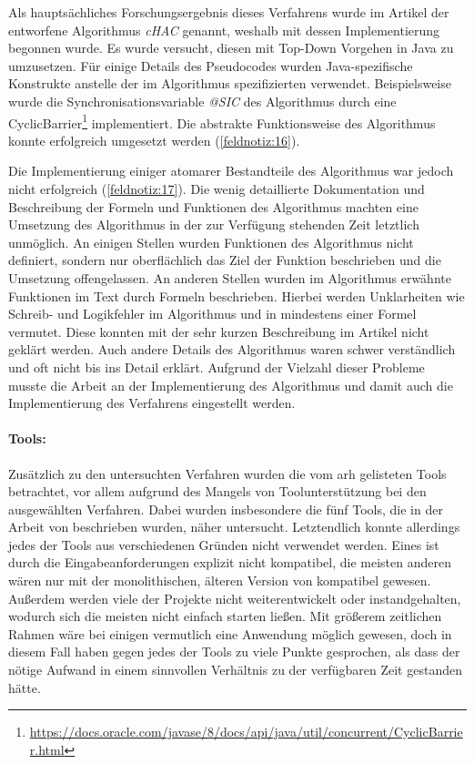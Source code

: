 Als hauptsächliches Forschungsergebnis dieses Verfahrens wurde im Artikel der entworfene Al\-go\-rith\-mus \emph{cHAC} genannt, weshalb mit dessen Implementierung begonnen wurde.
Es wurde versucht, diesen mit Top-Down Vorgehen in Java zu umzusetzen.
Für einige Details des Pseu\-do\-codes wurden Java-spezifische Konstrukte anstelle der im Algorithmus spezifizierten verwendet.
Beispielsweise wurde die Synchronisationsvariable \emph{@SIC} des Algorithmus durch eine CyclicBarrier\footnote{\url{https://docs.oracle.com/javase/8/docs/api/java/util/concurrent/CyclicBarrier.html}} implementiert.
Die abstrakte Funktionsweise des Algorithmus konnte erfolgreich umgesetzt werden (\cref{feldnotiz:16}).

Die Implementierung einiger atomarer Bestandteile des Algorithmus war jedoch nicht erfolgreich (\cref{feldnotiz:17}).
Die wenig detaillierte Dokumentation und Beschreibung der Formeln und Funktionen des Algorithmus machten eine Umsetzung des Algorithmus in der zur Verfügung stehenden Zeit letztlich unmöglich.
An einigen Stellen wurden Funktionen des Algorithmus nicht definiert, sondern nur oberflächlich das Ziel der Funktion beschrieben und die Umsetzung offengelassen.
An anderen Stellen wurden im Algorithmus erwähnte Funktionen im Text durch Formeln beschrieben.
Hierbei werden Unklarheiten wie Schreib- und Logikfehler im Algorithmus und in mindestens einer Formel vermutet.
Diese konnten mit der sehr kurzen Beschreibung im Artikel nicht geklärt werden.
Auch andere Details des Algorithmus waren schwer verständlich und oft nicht bis ins Detail erklärt.
Aufgrund der Vielzahl dieser Probleme musste die Arbeit an der Implementierung des Algorithmus und damit auch die Implementierung des Verfahrens eingestellt werden.

\paragraph{Tools:} Zusätzlich zu den untersuchten Verfahren wurden die vom \gls{arh} gelisteten Tools betrachtet, vor allem aufgrund des Mangels von Toolunterstützung bei den aus\-ge\-wähl\-ten Verfahren.
Dabei wurden insbesondere die fünf Tools, die in der Arbeit von  beschrieben wurden, näher untersucht.
Letztendlich konnte allerdings jedes der Tools aus verschiedenen Gründen nicht verwendet werden.
Eines ist durch die Eingabeanforderungen explizit nicht kompatibel, die meisten anderen wären nur mit der monolithischen, älteren Version von \jf kompatibel gewesen.
Außerdem werden viele der Projekte nicht weiterentwickelt oder instandgehalten, wodurch sich die meisten nicht einfach starten ließen.
Mit größerem zeitlichen Rahmen wäre bei einigen vermutlich eine Anwendung möglich gewesen, doch in diesem Fall haben gegen jedes der Tools zu viele Punkte gesprochen, als dass der nötige Aufwand in einem sinnvollen Verhältnis zu der verfügbaren Zeit gestanden hätte.

